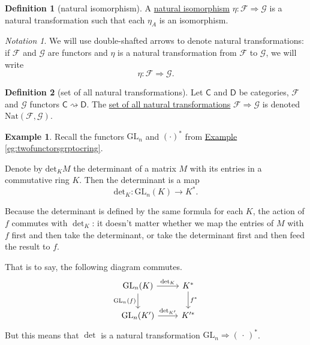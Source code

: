\documentclass[a4paper,10pt]{scrreprt}
\newcommand{\defn}[1]{\ul{#1}}
\newcommand{\GL}{\mathrm{GL}}
\newcommand{\Nat}{\mathrm{Nat}}
\theoremstyle{definition}
\newtheorem{definition}{Definition}[section]
\newtheorem{example}{Example}[section]
\theoremstyle{plain}
\theoremstyle{remark}
\newtheorem{notation}{Notation}[section]
\begin{document}
\begin{definition}[natural isomorphism]
  \label{def:naturalisomorphism}
  A \defn{natural isomorphism} $\eta\colon \mathcal{F} \Rightarrow \mathcal{G}$ is a natural transformation such that each $\eta_{A}$ is an isomorphism.
\end{definition}


\begin{notation}
  We will use double-shafted arrows to denote natural transformations: if $\mathcal{F}$ and $\mathcal{G}$ are functors and $\eta$ is a natural transformation from $\mathcal{F}$ to $\mathcal{G}$, we will write
  \begin{equation*}
    \eta\colon \mathcal{F} \Rightarrow \mathcal{G}.
  \end{equation*}
\end{notation}

\begin{definition}[set of all natural transformations]
  \label{def:setofallnaturaltransformations}
  Let $\mathsf{C}$ and $\mathsf{D}$ be categories, $\mathcal{F}$ and $\mathcal{G}$ functors $\mathsf{C} \rightsquigarrow \mathsf{D}$. The \defn{set of all natural transformations} $\mathcal{F} \Rightarrow \mathcal{G}$ is denoted $\Nat(\mathcal{F}, \mathcal{G})$.
\end{definition} 

\begin{example}
  Recall the functors $\mathrm{GL}_{n}$ and $(\cdot)^{*}$ from \hyperref[eg:twofunctorsgrptocring]{Example \ref*{eg:twofunctorsgrptocring}}.

  Denote by $\mathrm{det}_{K}M$ the determinant of a matrix $M$ with its entries in a commutative ring $K$. Then the determinant is a map
  \begin{equation*}
    \mathrm{det}_{K}\colon \GL_{n}(K) \to K^{*}.
  \end{equation*}

  Because the determinant is defined by the same formula for each $K$, the action of $f$ commutes with $\det_{K}$: it doesn't matter whether we map the entries of $M$ with $f$ first and then take the determinant, or take the determinant first and then feed the result to $f$.

  That is to say, the following diagram commutes.
  \begin{equation*}
    \begin{tikzcd}
      \GL_{n}(K)
      \arrow[r, "\det_{K}"]
      \arrow[d, swap, "\GL_{n}(f)"]
      & K^{*}
      \arrow[d, "f^{*}"]
      \\
      \GL_{n}(K')
      \arrow[r, "\det_{K'}"]
      & K'^{*}
    \end{tikzcd}
  \end{equation*}
  But this means that $\det$ is a natural transformation $\GL_{n} \Rightarrow \mathrm{(\,\cdot\,)^{*}}$.
\end{example}
\end{document}
